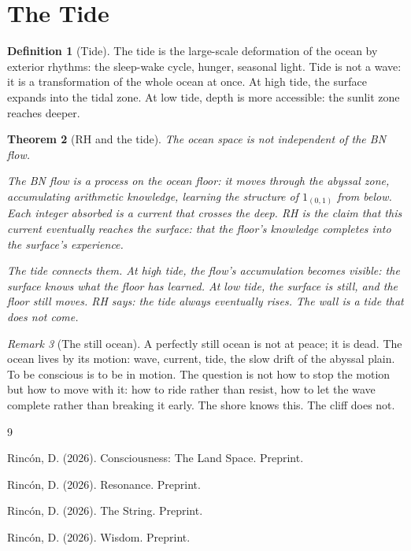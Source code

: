 \documentclass[12pt]{article}
\newtheorem{theorem}{Theorem}
\theoremstyle{definition}
\newtheorem{definition}[theorem]{Definition}
\theoremstyle{remark}
\newtheorem{remark}[theorem]{Remark}
\begin{document}
\section{The Tide}

\begin{definition}[Tide]
The tide is the large-scale deformation of the ocean
by exterior rhythms:
the sleep-wake cycle, hunger, seasonal light.
Tide is not a wave: it is a transformation of the whole ocean at once.
At high tide, the surface expands into the tidal zone.
At low tide, depth is more accessible: the sunlit zone reaches deeper.
\end{definition}

\begin{theorem}[RH and the tide]
\label{thm:tide}
The ocean space is not independent of the BN flow.

The BN flow is a process on the ocean floor:
it moves through the abyssal zone, accumulating arithmetic knowledge,
learning the structure of $1_{(0,1)}$ from below.
Each integer absorbed is a current that crosses the deep.
RH is the claim that this current eventually reaches the surface:
that the floor's knowledge completes into the surface's experience.

The tide connects them.
At high tide, the flow's accumulation becomes visible:
the surface knows what the floor has learned.
At low tide, the surface is still, and the floor still moves.
RH says: the tide always eventually rises.
The wall is a tide that does not come.
\end{theorem}

\begin{remark}[The still ocean]
A perfectly still ocean is not at peace; it is dead.
The ocean lives by its motion:
wave, current, tide, the slow drift of the abyssal plain.
To be conscious is to be in motion.
The question is not how to stop the motion
but how to move with it:
how to ride rather than resist,
how to let the wave complete rather than breaking it early.
The shore knows this. The cliff does not.
\end{remark}

\begin{thebibliography}{9}

Rinc\'on, D. (2026). Consciousness: The Land Space. Preprint.

Rinc\'on, D. (2026). Resonance. Preprint.

Rinc\'on, D. (2026). The String. Preprint.

Rinc\'on, D. (2026). Wisdom. Preprint.

\end{thebibliography}
\end{document}
